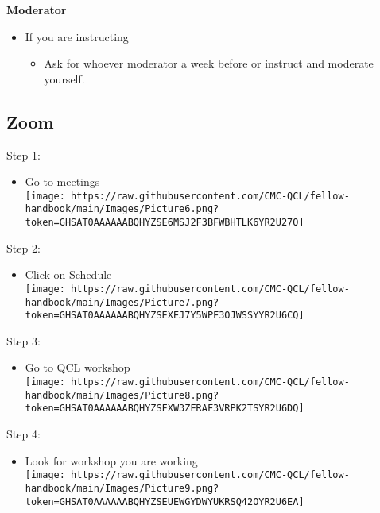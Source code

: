 \documentclass[
]{book}
\providecommand{\tightlist}{%
  \setlength{\itemsep}{0pt}\setlength{\parskip}{0pt}}
\begin{document}
\textbf{Moderator}

\begin{itemize}
\tightlist
\item
  If you are instructing

  \begin{itemize}
  \tightlist
  \item
    Ask for whoever moderator a week before or instruct and moderate yourself.
  \end{itemize}
\end{itemize}

\hypertarget{zoom}{%
\subsection{Zoom}\label{zoom}}

Step 1:

\begin{itemize}
\tightlist
\item
  Go to meetings\\
  \texttt{[image: https://raw.githubusercontent.com/CMC-QCL/fellow-handbook/main/Images/Picture6.png?token=GHSAT0AAAAAABQHYZSE6MSJ2F3BFWBHTLK6YR2U27Q]}
\end{itemize}

Step 2:

\begin{itemize}
\tightlist
\item
  Click on Schedule\\
  \texttt{[image: https://raw.githubusercontent.com/CMC-QCL/fellow-handbook/main/Images/Picture7.png?token=GHSAT0AAAAAABQHYZSEXEJ7Y5WPF3OJWSSYYR2U6CQ]}
\end{itemize}

Step 3:

\begin{itemize}
\tightlist
\item
  Go to QCL workshop\\
  \texttt{[image: https://raw.githubusercontent.com/CMC-QCL/fellow-handbook/main/Images/Picture8.png?token=GHSAT0AAAAAABQHYZSFXW3ZERAF3VRPK2TSYR2U6DQ]}
\end{itemize}

Step 4:

\begin{itemize}
\tightlist
\item
  Look for workshop you are working\\
  \texttt{[image: https://raw.githubusercontent.com/CMC-QCL/fellow-handbook/main/Images/Picture9.png?token=GHSAT0AAAAAABQHYZSEUEWGYDWYUKRSQ42OYR2U6EA]}
\end{itemize}
\end{document}
